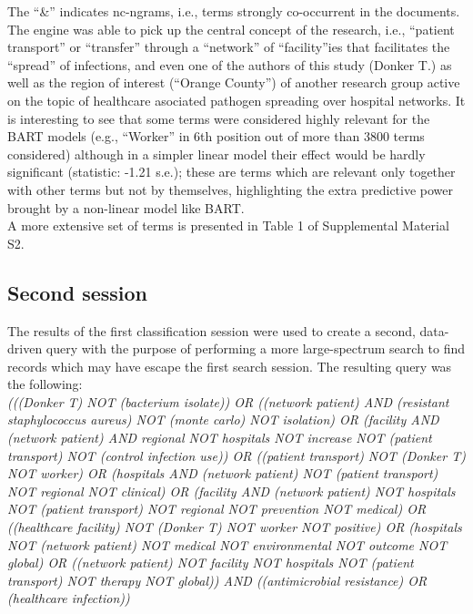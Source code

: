 \documentclass{article}
\begin{document}
The ``\&'' indicates nc-ngrams, i.e., terms strongly co-occurrent in the
documents.\\
The engine was able to pick up the central concept of the research,
i.e., ``patient transport'' or ``transfer'' through a ``network'' of
``facility''ies that facilitates the ``spread'' of infections, and even
one of the authors of this study (Donker T.) as well as the region of
interest (``Orange County'') of another research group active on the
topic of healthcare asociated pathogen spreading over hospital networks.
It is interesting to see that some terms were considered highly relevant
for the BART models (e.g., ``Worker'' in 6th position out of more than
3800 terms considered) although in a simpler linear model their effect
would be hardly significant (statistic: -1.21 s.e.); these are terms
which are relevant only together with other terms but not by themselves,
highlighting the extra predictive power brought by a non-linear model
like BART.\\
A more extensive set of terms is presented in Table 1 of Supplemental
Material S2.

\hypertarget{second-session}{%
\subsection{Second session}\label{second-session}}

The results of the first classification session were used to create a
second, data-driven query with the purpose of performing a more
large-spectrum search to find records which may have escape the first
search session. The resulting query was the following:\\

\emph{(((Donker T) NOT (bacterium isolate)) OR ((network patient) AND
(resistant staphylococcus aureus) NOT (monte carlo) NOT isolation) OR
(facility AND (network patient) AND regional NOT hospitals NOT increase
NOT (patient transport) NOT (control infection use)) OR ((patient
transport) NOT (Donker T) NOT worker) OR (hospitals AND (network
patient) NOT (patient transport) NOT regional NOT clinical) OR (facility
AND (network patient) NOT hospitals NOT (patient transport) NOT regional
NOT prevention NOT medical) OR ((healthcare facility) NOT (Donker T) NOT
worker NOT positive) OR (hospitals NOT (network patient) NOT medical NOT
environmental NOT outcome NOT global) OR ((network patient) NOT facility
NOT hospitals NOT (patient transport) NOT therapy NOT global)) AND
((antimicrobial resistance) OR (healthcare infection))}
\end{document}
